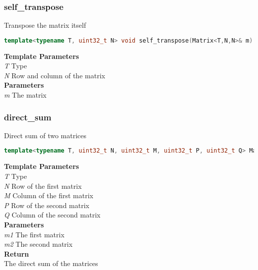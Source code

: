 \subsubsection{self\_transpose}
\begin{mdframed}
Transpose the matrix itself
\begin{lstlisting}[language=C++]
template<typename T, uint32_t N> void self_transpose(Matrix<T,N,N>& m) 
\end{lstlisting}
\textbf{Template Parameters} \\ 
\textit{T} Type \\ 
\textit{N} Row and column of the matrix \\ 
\textbf{Parameters} \\ 
\textit{m} The matrix \\ 
\end{mdframed}

\subsubsection{direct\_sum}
\begin{mdframed}
Direct sum of two matrices
\begin{lstlisting}[language=C++]
template<typename T, uint32_t N, uint32_t M, uint32_t P, uint32_t Q> Matrix<T,N+P,M+Q> direct_sum(const Matrix<T,N,M>& m1, const Matrix<T,P,Q>& m2) 
\end{lstlisting}
\textbf{Template Parameters} \\ 
\textit{T} Type \\ 
\textit{N} Row of the first matrix \\ 
\textit{M} Column of the first matrix \\ 
\textit{P} Row of the second matrix \\ 
\textit{Q} Column of the second matrix \\ 
\textbf{Parameters} \\ 
\textit{m1} The first matrix \\ 
\textit{m2} The second matrix \\ 
\textbf{Return} \\ 
The direct sum of the matrices\\ 
\end{mdframed}

